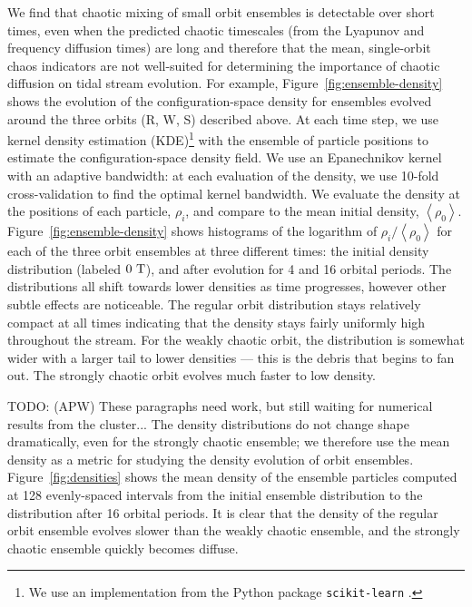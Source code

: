 \documentclass[letterpaper,12pt,preprint]{aastex}
\newcommand{\mean}[1]{\left< #1 \right>}
\newcommand{\periods}{\ensuremath{{\rm T}}}
\newcommand{\todo}[2]{{\color{red} TODO: (\MakeUppercase{#1}) #2}}
\begin{document}
We find that chaotic mixing of small orbit ensembles is detectable over short times, even when the predicted chaotic timescales (from the Lyapunov and frequency diffusion times) are long and therefore that the mean, single-orbit chaos indicators are not well-suited for determining the importance of chaotic diffusion on tidal stream evolution. For example, Figure~\ref{fig:ensemble-density} shows the evolution of the configuration-space density for ensembles evolved around the three orbits (R, W, S) described above. At each time step, we use kernel density estimation (KDE)\footnote{We use an implementation from the Python package \texttt{scikit-learn} \citep{scikitlearn}.} with the ensemble of particle positions to estimate the configuration-space density field. We use an Epanechnikov kernel with an adaptive bandwidth: at each evaluation of the density, we use 10-fold cross-validation to find the optimal kernel bandwidth. We evaluate the density at the positions of each particle, $\rho_i$, and compare to the mean initial density, $\mean{\rho_0}$. Figure~\ref{fig:ensemble-density} shows histograms of the logarithm of $\rho_i/\mean{\rho_0}$ for each of the three orbit ensembles at three different times: the initial density distribution (labeled $0~\periods$), and after evolution for 4 and 16 orbital periods. The distributions all shift towards lower densities as time progresses, however other subtle effects are noticeable. The regular orbit distribution stays relatively compact at all times indicating that the density stays fairly uniformly high throughout the stream. For the weakly chaotic orbit, the distribution is somewhat wider with a larger tail to lower densities --- this is the debris that begins to fan out. The strongly chaotic orbit evolves much faster to low density. 

\todo{apw}{These paragraphs need work, but still waiting for numerical results from the cluster...}
The density distributions do not change shape dramatically, even for the strongly chaotic ensemble; we therefore use the mean density as a metric for studying the density evolution of orbit ensembles. Figure~\ref{fig:densities} shows the mean density of the ensemble particles computed at 128 evenly-spaced intervals from the initial ensemble distribution to the distribution after 16 orbital periods. It is clear that the density of the regular orbit ensemble evolves slower than the weakly chaotic ensemble, and the strongly chaotic ensemble quickly becomes diffuse.
\end{document}
